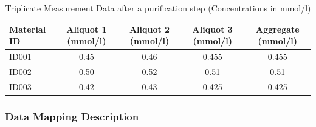 \begin{table}[ht]
\centering
\caption{Triplicate Measurement Data after a purification step (Concentrations in mmol/l)}
\label{tab:triplicate_measurements}
\begin{tabular}{lccc c}
\toprule
\textbf{Material ID} & \textbf{Aliquot 1 (mmol/l)} & \textbf{Aliquot 2 (mmol/l)} & \textbf{Aliquot 3 (mmol/l)} & \textbf{Aggregate (mmol/l)} \\
\midrule
ID001 & 0.45 & 0.46 & 0.455 & 0.455 \\
ID002 & 0.50 & 0.52 & 0.51  & 0.51  \\
ID003 & 0.42 & 0.43 & 0.425 & 0.425 \\
\bottomrule
\end{tabular}
\end{table}

\subsubsection*{Data Mapping Description}

